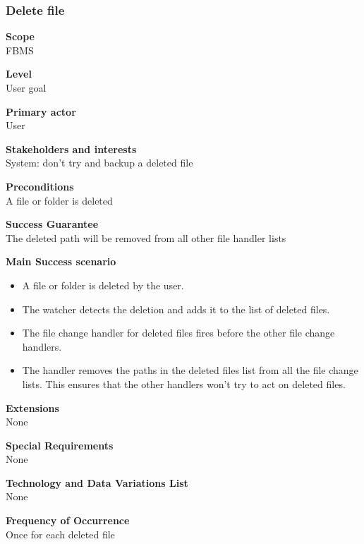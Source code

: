 \documentclass[12pt,a4paper]{article}
\begin{document}
\subsubsection{Delete file}
\begin{description}
	\item \textbf{Scope} \\
		FBMS
	\item \textbf{Level} \\
		User goal
	\item \textbf{Primary actor} \\
		User 
	\item \textbf{Stakeholders and interests} \\
		System: don't try and backup a deleted file
	\item \textbf{Preconditions} \\
		A file or folder is deleted
	\item \textbf{Success Guarantee} \\
		The deleted path will be removed from all other file handler lists
	\item \textbf{Main Success scenario} \vspace{-4ex} \\
	\begin{itemize}
		\item A file or folder is deleted by the user.
		\item The watcher detects the deletion and adds it to the list of deleted files. 
		\item The file change handler for deleted files fires before the other file change handlers.
		\item The handler removes the paths in the deleted files list from all the file change lists. This ensures that the other handlers won't try to act on deleted files.
	\end{itemize}
	\item \textbf{Extensions} \\
		None
	\item \textbf{Special Requirements}\\
		None
	\item \textbf{Technology and Data Variations List}\\
		None
	\item \textbf{Frequency of Occurrence}\\
		Once for each deleted file
\end{description}
\end{document}
